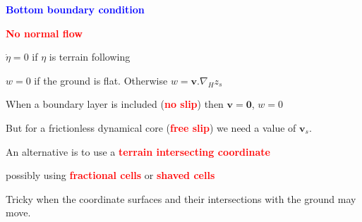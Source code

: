 \documentclass[a4]{seminar}
\newcommand{\R}[1]{\textcolor{red}{#1}}
\newcommand{\B}[1]{\textcolor{blue}{#1}}
\begin{document}
\begin{slide}

\B{\bf Bottom boundary condition}

\vspace{2mm}

\begin{minipage}{55mm}
\R{\bf No normal flow}
\end{minipage}
\begin{minipage}{55mm}
\begin{center}
\end{center}
\end{minipage}

\vspace{2mm}

\( \dot{\eta} = 0 \) if \( \eta \) is terrain following

\vspace{2mm}

\( w = 0 \) if the ground is flat. Otherwise \( w = \mathbf{v} . \nabla_{H} z_s \)

\vspace{2mm}

When a boundary layer is included (\R{\bf no slip}) then
\( \mathbf{v} = \mathbf{0} \), \( w = 0 \)

But for a frictionless dynamical core (\R{\bf free slip})
we need a value of \( \mathbf{v}_s \).



\end{slide}


\begin{slide}

An alternative is to use a \R{\bf terrain intersecting coordinate}

\begin{center}
\end{center}

possibly using \R{\bf fractional cells} or \R{\bf shaved cells}

\vspace{2mm}

Tricky when the coordinate surfaces and their intersections with
the ground may move.



\end{slide}
\end{document}
